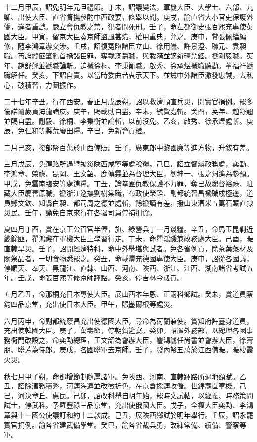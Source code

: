 \begin{pinyinscope}
十二月甲辰，詔免明年元旦禮節。丁未，詔議變法，軍機大臣、大學士、六部、九卿、出使大臣、直省督撫參酌中西政要，條舉以聞。庚戌，諭直省大小官吏保護外僑，違者重譴。嚴立會仇教之禁，犯者問死刑。壬子，命左都御史張百熙充專使英國大臣。甲寅，留京大臣奏京師盜風甚熾，權用重典，允之。庚申，賞張佩綸編修，隨李鴻章辦交涉。壬戌，詔復冤陷諸臣立山、徐用儀、許景澄、聯元、袁昶職。再論縱匪肇亂首禍諸臣罪，奪載瀾爵職，與載漪並謫新疆禁錮。褫剛毅職。英年、趙舒翹並褫職論斬。追褫徐桐、李秉衡職。啟秀、徐承煜褫職聽勘。董福祥褫職解任。癸亥，下詔自責。以當時委曲苦衷示天下。並誡中外諸臣激發忠誠，去私心，破積習，力圖振作。

二十七年辛丑，行在西安。春正月戊辰朔，詔以救濟順直兵災，開實官捐例。罷多倫諾爾歲貢海龍諸皮。庚午，賜載勛自盡。辛未，毓賢處斬。癸酉，英年、趙舒翹並賜自盡。剛毅、徐桐、李秉衡並論斬，以前沒免。乙亥，啟秀、徐承煜處斬。庚辰，免仁和等縣荒廢田糧。辛巳，免新會貢橙。

二月己亥，撥部帑百萬於山西備賑。壬子，廣東郎中黎國廉等進方物，升敘有差。

三月戊辰，免蹕路所過暨被災陜西咸寧等處稅糧。己巳，詔立督辦政務處，奕劻、李鴻章、榮祿、昆岡、王文韶、鹿傳霖並為督理大臣，劉坤一、張之洞遙為參預。甲戌，免雲南臨安等處逋糧。丁丑，論拳匪仇教保護不力罪，奪已故總督裕祿、駐藏大臣慶善原職，褫浙江巡撫劉樹棠職，布政使榮銓、副都統晉昌褫職戍極邊，道員鄭文欽、知縣白昶、都司周之德並處斬，餘褫謫有差。撥山東漕米五萬石賑直隸災民。壬午，諭免自京來行在各署司員停補扣資。

夏四月丁酉，賞在京王公百官半俸，旗、綠營兵丁一月錢糧。辛丑，命馬玉昆剿近畿餘匪，瞿鴻禨在軍機大臣上學習行走。丁未，命瞿鴻禨兼政務處大臣。己酉，賑直隸旱災。壬子，詔開經濟特科，命中外舉堪與試者。免各省例貢，除茶葉藥材及關祭品者，一切食物悉罷之。癸丑，命載灃充德國專使大臣。庚申，詔從各國議，停順天、奉天、黑龍江、直隸、山西、河南、陜西、浙江、江西、湖南諸省考試五年。壬戌，命張百熙等修京師蹕路。癸亥，停吉林今歲貢。

五月乙丑，命那桐充日本專使大臣。展山西本年恩、正兩科鄉試。癸未，賞道員蔡鈞四品京堂，充出使日本大臣。甲午，賑墨爾根等處災。

六月丙申，命副都統廕昌充出使德國大臣，尋命為荷蘭兼使。賞知府許臺身道員，充出使韓國大臣。庚子，萬壽節，停朝賀筵宴。癸卯，詔置外務部，以總理各國事務衙門改設之，命奕劻總理，王文韶為會辦大臣，瞿鴻禨任尚書並會辦大臣，徐壽朋、聯芳為侍郎。庚戌，各國聯軍去京師。壬子，發內帑五萬於江西備賑。賑棲霞火災。

秋七月甲子朔，命鄧增節制隨扈諸軍。免陜西、河南、直隸蹕路所過地額賦。乙丑，詔除漕務積弊，河運海運並改徵折色，在京倉採運收儲。世鐸罷直軍機。己巳，河決章丘、惠民。己卯，詔改科舉自明年始，罷時文試帖，以經義、時務策問試士，停武科。予羅豐祿三品京堂，充出使俄國大臣。戊子，全權大臣奕劻、李鴻章與十一國公使議訂和約十二款成。己丑，展陜西鄉試於明年舉行。壬辰，詔永罷實官捐例。諭各省建武備學堂。癸巳，諭各省裁兵勇，改練常備、續備、警察等軍。


\end{pinyinscope}

